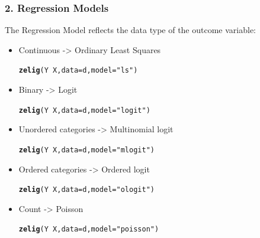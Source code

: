 \documentclass[xcolor=x11names,compress]{beamer}\usepackage[]{graphicx}\usepackage[]{color}
\makeatletter
\newcommand{\hlstr}[1]{\textcolor[rgb]{0.192,0.494,0.8}{#1}}%
\newcommand{\hlopt}[1]{\textcolor[rgb]{0,0,0}{#1}}%
\newcommand{\hlstd}[1]{\textcolor[rgb]{0.345,0.345,0.345}{#1}}%
\newcommand{\hlkwc}[1]{\textcolor[rgb]{0.333,0.667,0.333}{#1}}%
\newcommand{\hlkwd}[1]{\textcolor[rgb]{0.737,0.353,0.396}{\textbf{#1}}}%
\newenvironment{kframe}{%
 \def\at@end@of@kframe{}%
 \ifinner\ifhmode%
  \def\at@end@of@kframe{\end{minipage}}%
  \begin{minipage}{\columnwidth}%
 \fi\fi%
 \def\FrameCommand##1{\hskip\@totalleftmargin \hskip-\fboxsep
 \colorbox{shadecolor}{##1}\hskip-\fboxsep
     \hskip-\linewidth \hskip-\@totalleftmargin \hskip\columnwidth}%
 \MakeFramed {\advance\hsize-\width
   \@totalleftmargin\z@ \linewidth\hsize
   \@setminipage}}%
 {\par\unskip\endMakeFramed%
 \at@end@of@kframe}
\newenvironment{knitrout}{}{} %
\renewcommand{\(}{\begin{columns}}
\renewcommand{\)}{\end{columns}}
\newcommand{\<}[1]{\begin{column}{#1}}
\renewcommand{\>}{\end{column}}
\makeatother
\begin{document}
\begin{frame}
\frametitle{2. Regression Models}
The Regression Model reflects the data type of the outcome variable:
\begin{itemize}
\item Continuous -> Ordinary Least Squares  
\begin{knitrout}
\color{fgcolor}\begin{kframe}
\begin{alltt}
\hlkwd{zelig}\hlstd{(Y} \hlopt{~} \hlstd{X,}\hlkwc{data}\hlstd{=d,}\hlkwc{model}\hlstd{=}\hlstr{"ls"}\hlstd{)}
\end{alltt}
\end{kframe}
\end{knitrout}
\item Binary -> Logit  
\begin{knitrout}
\color{fgcolor}\begin{kframe}
\begin{alltt}
\hlkwd{zelig}\hlstd{(Y} \hlopt{~} \hlstd{X,}\hlkwc{data}\hlstd{=d,}\hlkwc{model}\hlstd{=}\hlstr{"logit"}\hlstd{)}
\end{alltt}
\end{kframe}
\end{knitrout}
\item Unordered categories -> Multinomial logit  
\begin{knitrout}
\color{fgcolor}\begin{kframe}
\begin{alltt}
\hlkwd{zelig}\hlstd{(Y} \hlopt{~} \hlstd{X,}\hlkwc{data}\hlstd{=d,}\hlkwc{model}\hlstd{=}\hlstr{"mlogit"}\hlstd{)}
\end{alltt}
\end{kframe}
\end{knitrout}
\item Ordered categories -> Ordered logit  
\begin{knitrout}
\color{fgcolor}\begin{kframe}
\begin{alltt}
\hlkwd{zelig}\hlstd{(Y} \hlopt{~} \hlstd{X,}\hlkwc{data}\hlstd{=d,}\hlkwc{model}\hlstd{=}\hlstr{"ologit"}\hlstd{)}
\end{alltt}
\end{kframe}
\end{knitrout}
\item Count -> Poisson  
\begin{knitrout}
\color{fgcolor}\begin{kframe}
\begin{alltt}
\hlkwd{zelig}\hlstd{(Y} \hlopt{~} \hlstd{X,}\hlkwc{data}\hlstd{=d,}\hlkwc{model}\hlstd{=}\hlstr{"poisson"}\hlstd{)}
\end{alltt}
\end{kframe}
\end{knitrout}
\end{itemize}
\end{frame}
\end{document}
